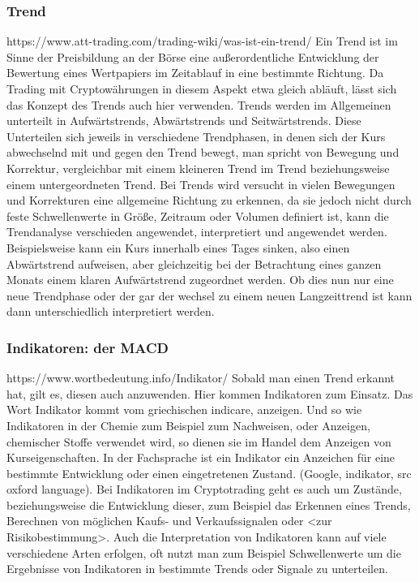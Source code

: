 \documentclass[12pt]{article}
\begin{document}
	\subsubsection{Trend}
		https://www.att-trading.com/trading-wiki/was-ist-ein-trend/
		\glqq Ein Trend ist im Sinne der Preisbildung an der Börse eine außerordentliche Entwicklung der Bewertung eines Wertpapiers im Zeitablauf in eine bestimmte Richtung\grqq{}. Da Trading mit Cryptowährungen in diesem Aspekt etwa gleich abläuft, lässt sich das Konzept des Trends auch hier verwenden. Trends werden im Allgemeinen unterteilt in Aufwärtstrends, Abwärtstrends und Seitwärtstrends. Diese Unterteilen sich jeweils in verschiedene Trendphasen, in denen sich der Kurs abwechselnd mit und gegen den Trend bewegt, man spricht von Bewegung und Korrektur, vergleichbar mit einem kleineren Trend im Trend beziehungsweise einem untergeordneten Trend. Bei Trends wird versucht in vielen Bewegungen und Korrekturen eine allgemeine Richtung zu erkennen, da sie jedoch nicht durch feste Schwellenwerte in Größe, Zeitraum oder Volumen definiert ist, kann die Trendanalyse verschieden angewendet, interpretiert und angewendet werden. Beispielsweise kann ein Kurs innerhalb eines Tages sinken, also einen Abwärtstrend aufweisen, aber gleichzeitig bei der Betrachtung eines ganzen Monats einem klaren Aufwärtstrend zugeordnet werden. Ob dies nun nur eine neue Trendphase oder der gar der wechsel zu einem neuen Langzeittrend ist kann dann unterschiedlich interpretiert werden.
	\subsubsection{Indikatoren: der MACD}
		https://www.wortbedeutung.info/Indikator/ Sobald man einen Trend erkannt hat, gilt es, diesen auch anzuwenden. Hier kommen Indikatoren zum Einsatz. Das Wort Indikator kommt vom griechischen indicare, \glqq anzeigen\grqq{}. Und so wie Indikatoren in der Chemie zum Beispiel zum Nachweisen, oder Anzeigen, chemischer Stoffe verwendet wird, so dienen sie im Handel dem Anzeigen von Kurseigenschaften. In der Fachsprache ist ein Indikator ein Anzeichen für eine bestimmte Entwicklung oder einen eingetretenen Zustand. (Google, indikator, src oxford language). Bei Indikatoren im Cryptotrading geht es auch um Zustände, beziehungsweise die Entwicklung dieser, zum Beispiel das Erkennen eines Trends, Berechnen von möglichen Kaufs- und Verkaufssignalen oder <zur Risikobestimmung>. Auch die Interpretation von Indikatoren kann auf viele verschiedene Arten erfolgen, oft nutzt man zum Beispiel Schwellenwerte um die Ergebnisse von Indikatoren in bestimmte Trends oder Signale zu unterteilen.
\end{document}
